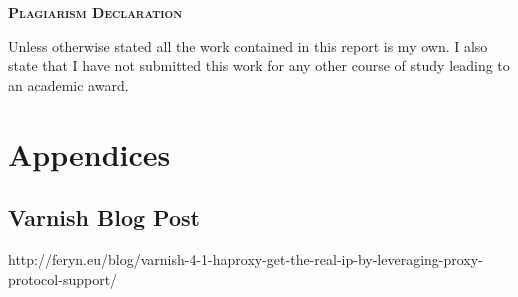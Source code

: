 \documentclass{article}
\begin{document}
\onehalfspacing
\hypersetup{pageanchor=false}

\hypersetup{pageanchor=true}
\clearpage
\begin{center}
\begin{minipage}{\textwidth}
  
  {\scshape\large \textbf{Plagiarism Declaration}\par}
  \vspace{1cm}
  Unless otherwise stated all the work contained in this report is my own.  I also state that I have not submitted this work for any other course of study leading to an academic award.
\end{minipage}
\end{center}
\vfill %
\clearpage

\tableofcontents

\newpage


\newpage



\newpage
\appendix
\section*{Appendices}
\renewcommand{\thesubsection}{\Alph{subsection}}

\subsection{Varnish Blog Post} 
\label{appendix:blog}
http://feryn.eu/blog/varnish-4-1-haproxy-get-the-real-ip-by-leveraging-proxy-protocol-support/

\newpage

\end{document}
